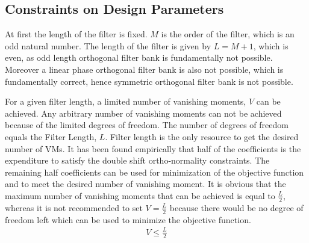 \subsection{Constraints on Design Parameters}
\label{sub: Constraints on Design Parameters}
At first the length of the filter is fixed. $M$ is the order of the filter, which is an odd natural number. The length of the filter is given by $L = M +1$, which is even, as odd length orthogonal filter bank is fundamentally not possible. Moreover a linear phase orthogonal filter bank is also not possible, which is fundamentally correct, hence symmetric orthogonal filter bank is not possible.

For a given filter length, a limited number of vanishing moments, $V$ can be achieved. Any arbitrary number of vanishing moments can not be achieved because of the limited degrees of freedom. The number of degrees of freedom equals the Filter Length, $L$. Filter length is the only resource to get the desired number of VMs. It has been found empirically that half of the coefficients is the expenditure to satisfy the double shift ortho-normality constraints. The remaining half coefficients can be used for minimization of the objective function and to meet the desired number of vanishing moment. It is obvious that the maximum number of vanishing moments that can be achieved is equal to $\frac{L}{2}$, whereas it is not recommended to set $V=\frac{L}{2}$ because there would be no degree of freedom left which can be used to minimize the objective function. 
\begin{eqnarray}
\label{eq: Constraints on VM}
V \leq \frac{L}{2}
\end{eqnarray}

